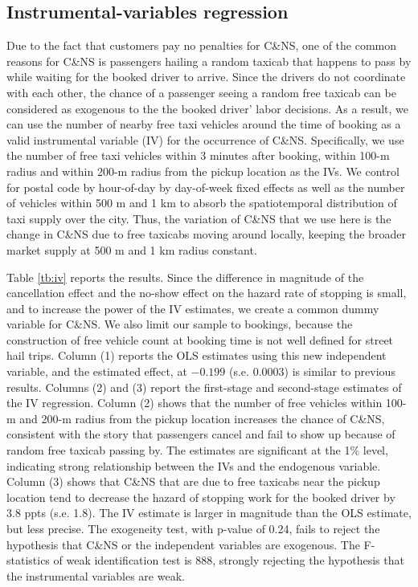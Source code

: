 \documentclass[reviewmode,AEJ]{AEA}
\begin{document}
\begin{appendices}
\section{Instrumental-variables regression}
\label{apx:iv}
Due to the fact that customers pay no penalties for C\&NS, one of the common reasons for C\&NS 
is passengers hailing a random taxicab that happens to pass by while waiting for the booked driver to arrive. 
Since the drivers do not coordinate with each other, the chance of a passenger seeing a random
free taxicab can be considered as exogenous to the the booked driver' labor decisions.
As a result, we can use the number of nearby free taxi vehicles around the time of 
booking as a valid instrumental variable (IV) for the occurrence of C\&NS.
Specifically, we use the number of free taxi vehicles within 3 minutes after booking, 
within 100-m radius and within 200-m radius from the pickup location as the IVs. We control for postal code by hour-of-day by day-of-week fixed effects as
well as the number of vehicles within 500 m and 1 km to absorb the spatiotemporal distribution
of taxi supply over the city. Thus, the variation of C\&NS that we use here is the change in C\&NS
due to free taxicabs moving around locally, keeping the broader market supply at 500 m and 1 km 
radius constant. 

Table \ref{tb:iv} reports the results. Since the difference in magnitude of the cancellation effect
and the no-show effect on the hazard rate of stopping is small, 
and to increase the power of the IV estimates, we create
a common dummy variable for C\&NS. We also limit our sample to bookings, because the construction
of free vehicle count at booking time is not well defined for street hail trips.
Column (1) reports the OLS estimates using this new
independent variable, and the estimated effect, at $-0.199$ (s.e. $0.0003$) is similar 
to previous results.
Columns (2) and (3) report the first-stage and second-stage estimates of the IV regression.
Column (2) shows that the number of free vehicles within 100-m and 200-m radius from 
the pickup location increases the chance of C\&NS, consistent with the story that
passengers cancel and fail to show up because of random free taxicab passing by.
The estimates are significant at the 1\% level, indicating strong relationship between the IVs
 and the endogenous variable.
Column (3) shows that C\&NS  that are due to free taxicabs near the pickup location
tend to decrease the hazard of stopping work for the booked driver by 3.8 ppts (s.e. 1.8).
The IV estimate is larger in magnitude than the OLS estimate, but less precise.
The exogeneity test, with p-value of 0.24, fails to reject the hypothesis that C\&NS or
the independent variables are exogenous. The F-statistics of weak identification test is 888, strongly rejecting the hypothesis that the instrumental variables are weak.



\end{appendices}
\end{document}
